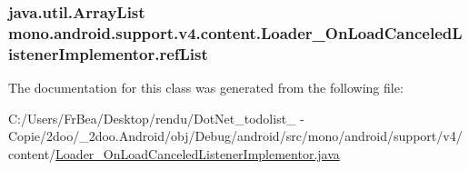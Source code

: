 \hypertarget{classmono_1_1android_1_1support_1_1v4_1_1content_1_1_loader___on_load_canceled_listener_implementor_78e19fe4a07053c89780b3ea627776f5}{
\subsubsection[{refList}]{\setlength{\rightskip}{0pt plus 5cm}java.util.ArrayList {\bf mono.android.support.v4.content.Loader\_\-OnLoadCanceledListenerImplementor.refList}}}
\label{classmono_1_1android_1_1support_1_1v4_1_1content_1_1_loader___on_load_canceled_listener_implementor_78e19fe4a07053c89780b3ea627776f5}




The documentation for this class was generated from the following file:\begin{CompactItemize}
\item 
C:/Users/FrBea/Desktop/rendu/DotNet\_\-todolist\_ - Copie/2doo/\_\-2doo.Android/obj/Debug/android/src/mono/android/support/v4/content/\hyperlink{_loader___on_load_canceled_listener_implementor_8java}{Loader\_\-OnLoadCanceledListenerImplementor.java}\end{CompactItemize}
